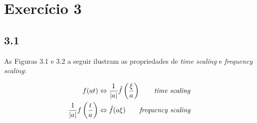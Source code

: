 
\section*{\large Exercício 3}
%



\subsection*{3.1} 
%

As Figuras 3.1 e 3.2 a seguir ilustram as propriedades de \textit{time scaling} e \textit{frequency scaling}:

\begin{align*}
f(at) &\Leftrightarrow  \frac{1}{|a|}\hat{f}\left( \frac{\xi}{a} \right) \tag*{\textit{time scaling}} \\
\frac{1}{|a|} f \left( \frac{t}{a} \right) &\Leftrightarrow \hat{f}(a \xi) \tag*{\textit{frequency scaling}} \\
\end{align*}

